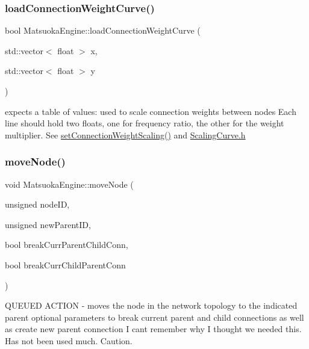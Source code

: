 \subsubsection{\texorpdfstring{load\+Connection\+Weight\+Curve()}{loadConnectionWeightCurve()}\hspace{0.1cm}{\footnotesize\ttfamily [2/2]}}
{\footnotesize\ttfamily bool Matsuoka\+Engine\+::load\+Connection\+Weight\+Curve (\begin{DoxyParamCaption}\item[{std\+::vector$<$ float $>$}]{x,  }\item[{std\+::vector$<$ float $>$}]{y }\end{DoxyParamCaption})}

expects a table of values\+: used to scale connection weights between nodes Each line should hold two floats, one for frequency ratio, the other for the weight multiplier. See \mbox{\hyperlink{classMatsuokaEngine_adb864bf26563682f94ba2e131fb8b793}{set\+Connection\+Weight\+Scaling()}} and \mbox{\hyperlink{ScalingCurve_8h}{Scaling\+Curve.\+h}} \mbox{\label{classMatsuokaEngine_abf37008845614f7b6a7ec0440141e06f}} 
\subsubsection{\texorpdfstring{move\+Node()}{moveNode()}}
{\footnotesize\ttfamily void Matsuoka\+Engine\+::move\+Node (\begin{DoxyParamCaption}\item[{unsigned}]{node\+ID,  }\item[{unsigned}]{new\+Parent\+ID,  }\item[{bool}]{break\+Curr\+Parent\+Child\+Conn,  }\item[{bool}]{break\+Curr\+Child\+Parent\+Conn }\end{DoxyParamCaption})}

Q\+U\+E\+U\+ED A\+C\+T\+I\+ON -\/ moves the node in the network topology to the indicated parent optional parameters to break current parent and child connections as well as create new parent connection I can\textquotesingle{}t remember why I thought we needed this. Has not been used much. Caution. \mbox{\label{classMatsuokaEngine_aac87afef0c7c99601fa77e2be27b2b74}} 
